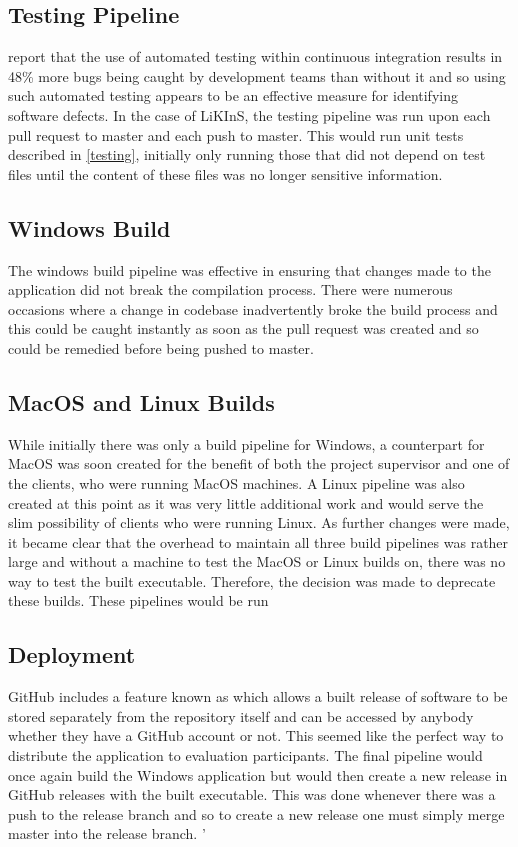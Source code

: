 \documentclass{l4proj}
\begin{document}
\subsection{Testing Pipeline}
\cite{vasilescu} report that the use of automated testing within continuous integration results in 48\% more bugs being caught by development teams than without it and so using such automated testing appears to be an effective measure for identifying software defects. In the case of LiKInS, the testing pipeline was run upon each pull request to master and each push to master. This would run unit tests described in \ref{testing}, initially only running those that did not depend on test files until the content of  these files was no longer sensitive information.
 
 \subsection{Windows Build}
 The windows build pipeline was effective in ensuring that changes made to the application did not break the compilation process. There were numerous occasions where a change in codebase inadvertently broke the build process and this could be caught instantly as soon as the pull request was created and so could be remedied before being pushed to master.
 
 \subsection{MacOS and Linux Builds}
 While initially there was only a build pipeline for Windows, a counterpart for MacOS was soon created for the benefit of both the project supervisor and one of the clients, who were running MacOS machines.  A Linux pipeline was also created at this point as it was very little additional work and would serve the slim possibility of clients who were running Linux. As further changes were made, it became clear that the overhead to maintain all three build pipelines was rather large and without a machine to test the MacOS or Linux builds on, there was no way to test the built executable. Therefore, the decision was made to deprecate these builds. These pipelines would be run 
 
\subsection{Deployment}
GitHub includes a feature known as  which allows a built release of software to be stored separately from the repository itself and can be accessed by anybody whether they have a GitHub account or not. This seemed like the perfect way to distribute the application to evaluation participants. The final pipeline would once again build the Windows application but would then create a new release in GitHub releases with the built executable. This was done whenever there was a push to the release branch and so to create a new release one must simply merge master into the release branch.
'
\end{document}
